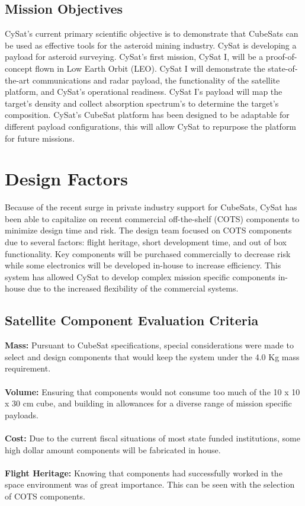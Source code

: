 \documentclass[nocover]            %
{CSLI}                       %
\begin{document}
\subsection{Mission Objectives}
CySat's current primary scientific objective is to demonstrate that CubeSats can be used as effective tools for the asteroid mining industry. CySat is developing a payload for asteroid surveying. CySat's first mission, CySat I, will be a proof-of-concept flown in Low Earth Orbit (LEO). CySat I will demonstrate the state-of-the-art communications and radar payload, the functionality of the satellite platform, and CySat's operational readiness. CySat I's payload will map the target's density and collect absorption spectrum's to determine the target's composition. CySat's CubeSat platform has been designed to be adaptable for different payload configurations, this will allow CySat to repurpose the platform for future missions.

\section{Design Factors}
Because of the recent surge in private industry support for CubeSats, CySat has been able to capitalize on recent commercial off-the-shelf (COTS) components to minimize design time and risk. The design team focused on COTS components due to several factors: flight heritage, short development time, and out of box functionality. Key components will be purchased commercially to decrease risk while some electronics will be developed in-house to increase efficiency. This system has allowed CySat to develop complex mission specific components in-house due to the increased flexibility of the commercial systems.
\subsection{Satellite Component Evaluation Criteria}
\textbf{Mass:} Pursuant to CubeSat specifications, special considerations were made to select and design components that would keep the system under the 4.0 Kg mass requirement.\\ 
\\\textbf{Volume:} Ensuring that components would not consume too much of the 10 x 10 x 30 cm cube, and building in allowances for a diverse range of mission specific payloads. \\
\\\textbf{Cost:} Due to the current fiscal situations of most state funded institutions, some high dollar amount components will be fabricated in house. \\
\\\textbf{Flight Heritage:} Knowing that components had successfully worked in the space environment was of great importance. This can be seen with the selection of COTS components.\\ 
\end{document}
